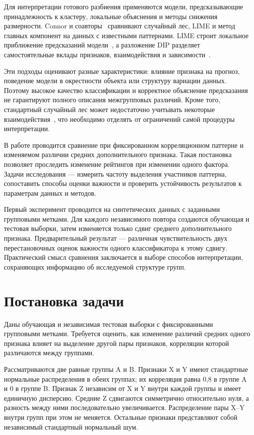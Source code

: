 \documentclass{article}
\begin{document}
Для интерпретации готового разбиения применяются модели, предсказывающие принадлежность к кластеру, локальные объяснения и методы снижения размерности. Connor и соавторы~\cite{connor2026} сравнивают случайный лес, LIME и метод главных компонент на данных с известными паттернами. LIME строит локальное приближение предсказаний модели~\cite{ribeiro2016}, а разложение DIP разделяет самостоятельные вклады признаков, взаимодействия и зависимости~\cite{konig2025}.

Эти подходы оценивают разные характеристики: влияние признака на прогноз, поведение модели в окрестности объекта или структуру вариации данных. Поэтому высокое качество классификации и корректное объяснение предсказания не гарантируют полного описания межгрупповых различий. Кроме того, стандартный случайный лес может недостаточно учитывать некоторые взаимодействия~\cite{blum2025}, что необходимо отделять от ограничений самой процедуры интерпретации.

В работе проводится сравнение при фиксированном корреляционном паттерне и изменяемом различии средних дополнительного признака. Такая постановка позволяет проследить изменение рейтингов при изменении одного фактора. Задачи исследования --- измерить частоту выделения участников паттерна, сопоставить способы оценки важности и проверить устойчивость результатов к параметрам данных и методов.

Первый эксперимент проводится на синтетических данных с заданными групповыми метками. Для каждого независимого повтора создаются обучающая и тестовая выборки, затем изменяется только сдвиг среднего дополнительного признака. Предварительный результат --- различная чувствительность двух перестановочных оценок важности одного классификатора к этому сдвигу. Практический смысл сравнения заключается в выборе способов интерпретации, сохраняющих информацию об исследуемой структуре групп.

\section{Постановка задачи}

Даны обучающая и независимая тестовая выборки с фиксированными групповыми метками. Требуется оценить, как изменение различий средних одного признака влияет на выделение другой пары признаков, корреляции которой различаются между группами.

Рассматриваются две равные группы A и B. Признаки X и Y имеют стандартные нормальные распределения в обеих группах; их корреляция равна 0,8 в группе A и 0 в группе B. Признак Z независим от X и Y внутри каждой группы и имеет единичную дисперсию. Средние Z сдвигаются симметрично относительно нуля, а разность между ними последовательно увеличивается. Распределение пары X--Y внутри групп при этом не меняется. Остальные признаки представляют собой независимый стандартный нормальный шум.
\end{document}
